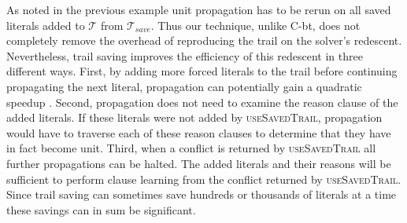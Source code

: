 \documentclass[runningheads]{llncs}
\renewcommand{\note}[1]{{\color{red}{#1}}}
\newcommand{\trail}{\ensuremath{\mathcal{T}}}
\newcommand{\cbt}{C-bt\xspace}
\newcommand{\trailsave}{\trail_{\mathit{save}}}
\newcommand{\ust}{\textsc{useSavedTrail}\xspace}
\begin{document}
As noted in the previous example unit propagation has to be rerun on
all saved literals added to $\trail$ from $\trailsave$. Thus our
technique, unlike \cbt, does not completely remove the overhead of
reproducing the trail on the solver's redescent. Nevertheless, trail
saving improves the efficiency of this redescent in three different
ways. First, by adding more forced literals to the trail before
continuing propagating the next literal, propagation can potentially
gain a quadratic speedup
\cite{DBLP:conf/sat/HickeyB19,DBLP:journals/jair/Gent13}. Second,
propagation does not need to examine the reason clause of the added
literals. If these literals were not added by \ust, propagation would
have to traverse each of these reason clauses to determine that they
have in fact become unit. Third, when a conflict is returned by
\ust all further propagations can be halted. The added literals and
their reasons will be sufficient to perform clause learning from the
conflict returned by \ust. Since trail saving can sometimes save
hundreds or thousands of literals at a time these savings can in sum
be significant.

\end{document}
